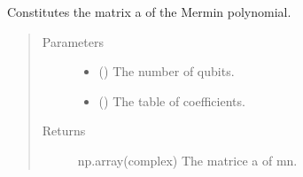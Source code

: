 \documentclass[letterpaper,10pt,english]{sphinxmanual}
\begin{document}
\begin{fulllineitems}
\label{\detokenize{mermin_polynomials-opti:mermin_on_qiskit.hypergraphstates_optimization.mermin_polynomials.a_matrix}}
Constitutes the matrix a of the Mermin polynomial.
\begin{quote}\begin{description}
\item[{Parameters}] \leavevmode\begin{itemize}
\item {} 
 () \textendash{} The number of qubits.

\item {} 
 (\sphinxstyleliteralemphasis{\sphinxupquote{(}}\sphinxstyleliteralemphasis{\sphinxupquote{(}}\sphinxstyleliteralemphasis{\sphinxupquote{)}}\sphinxstyleliteralemphasis{\sphinxupquote{)}}) \textendash{} The table of coefficients.

\end{itemize}

\item[{Returns}] \leavevmode
np.array(complex) \textendash{} The matrice a of mn.

\end{description}\end{quote}

\end{fulllineitems}

\end{document}

